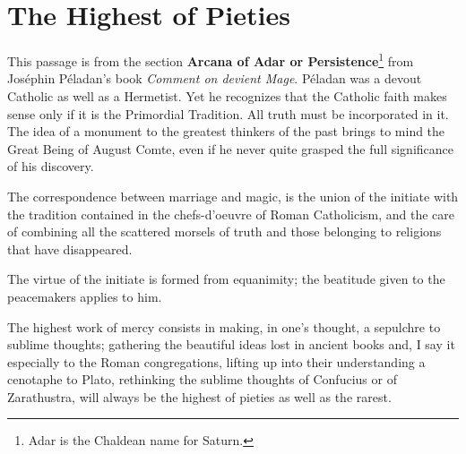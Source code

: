 \section{The Highest of Pieties}

This passage is from the section \textbf{Arcana of Adar or Persistence}\footnote{Adar is the Chaldean name for Saturn.} from Joséphin Péladan's book \emph{Comment on devient Mage}. Péladan was a devout Catholic as well as a Hermetist. Yet he recognizes that the Catholic faith makes sense only if it is the Primordial Tradition. All truth must be incorporated in it. The idea of a monument to the greatest thinkers of the past brings to mind the Great Being of August Comte, even if he never quite grasped the full significance of his discovery.

\begin{quotationx}
The correspondence between marriage and magic, is the union of the initiate with the tradition contained in the chefs-d'oeuvre of Roman Catholicism, and the care of combining all the scattered morsels of truth and those belonging to religions that have disappeared.

The virtue of the initiate is formed from equanimity; the beatitude given to the peacemakers applies to him.

The highest work of mercy consists in making, in one's thought, a sepulchre to sublime thoughts; gathering the beautiful ideas lost in ancient books and, I say it especially to the Roman congregations, lifting up into their understanding a cenotaphe to Plato, rethinking the sublime thoughts of Confucius or of Zarathustra, will always be the highest of pieties as well as the rarest.
\end{quotationx}




